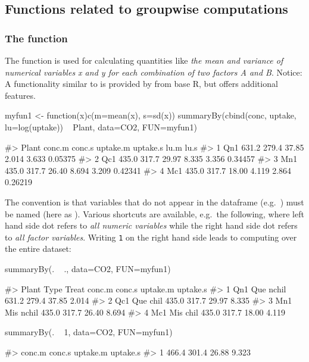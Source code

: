 \hypertarget{functions-related-to-groupwise-computations}{%
\subsection{Functions related to groupwise
computations}\label{functions-related-to-groupwise-computations}}

\hypertarget{the-function}{%
\subsubsection{\texorpdfstring{The 
function}{The  function}}\label{the-function}}

The  function is used for calculating quantities like
\emph{the mean and variance of numerical variables x and y for each
combination of two factors A and B}. Notice: A functionality similar to
 is provided by  from base R, but
 offers additional features.

\begin{Schunk}
\begin{Sinput}
myfun1 <- function(x){c(m=mean(x), s=sd(x))}
summaryBy(cbind(conc, uptake, lu=log(uptake)) ~ Plant, data=CO2, FUN=myfun1)
\end{Sinput}
\begin{Soutput}
#>   Plant conc.m conc.s uptake.m uptake.s  lu.m    lu.s
#> 1   Qn1  631.2  279.4    37.85    2.014 3.633 0.05375
#> 2   Qc1  435.0  317.7    29.97    8.335 3.356 0.34457
#> 3   Mn1  435.0  317.7    26.40    8.694 3.209 0.42341
#> 4   Mc1  435.0  317.7    18.00    4.119 2.864 0.26219
\end{Soutput}
\end{Schunk}

The convention is that variables that do not appear in the dataframe
(e.g.~) must be named (here as ). Various
shortcuts are available, e.g.~the following, where left hand side dot
refers to \emph{all numeric variables} while the right hand side dot
refers to \emph{all factor variables}. Writing \texttt{1} on the right
hand side leads to computing over the entire dataset:

\begin{Schunk}
\begin{Sinput}
summaryBy(. ~ ., data=CO2, FUN=myfun1)
\end{Sinput}
\begin{Soutput}
#>   Plant Type Treat conc.m conc.s uptake.m uptake.s
#> 1   Qn1  Que nchil  631.2  279.4    37.85    2.014
#> 2   Qc1  Que  chil  435.0  317.7    29.97    8.335
#> 3   Mn1  Mis nchil  435.0  317.7    26.40    8.694
#> 4   Mc1  Mis  chil  435.0  317.7    18.00    4.119
\end{Soutput}
\begin{Sinput}
summaryBy(. ~ 1, data=CO2, FUN=myfun1)
\end{Sinput}
\begin{Soutput}
#>   conc.m conc.s uptake.m uptake.s
#> 1  466.4  301.4    26.88    9.323
\end{Soutput}
\end{Schunk}

